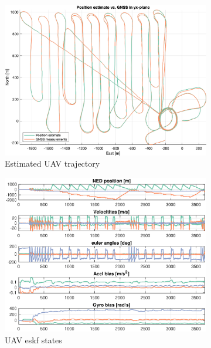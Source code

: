 \begin{figure}[ht]
    \centering
    \begin{subfigure}[b]{0.4\textwidth}
		\includegraphics[width=\textwidth]{figures/ga_2/real_trajectory.eps}
        \caption{Estimated UAV trajectory}
        \label{fig:ga_2_real_trajectory}
	\end{subfigure}%
    \begin{subfigure}[b]{0.4\textwidth}
		\includegraphics[width=\textwidth]{figures/ga_2/real_state.eps}
        \caption{UAV \acrshort{eskf} states}
        \label{fig:ga_2_real_state}
    \end{subfigure}
    \caption{}
    \label{fig:ga_2_real_trajectory_state}
\end{figure}

